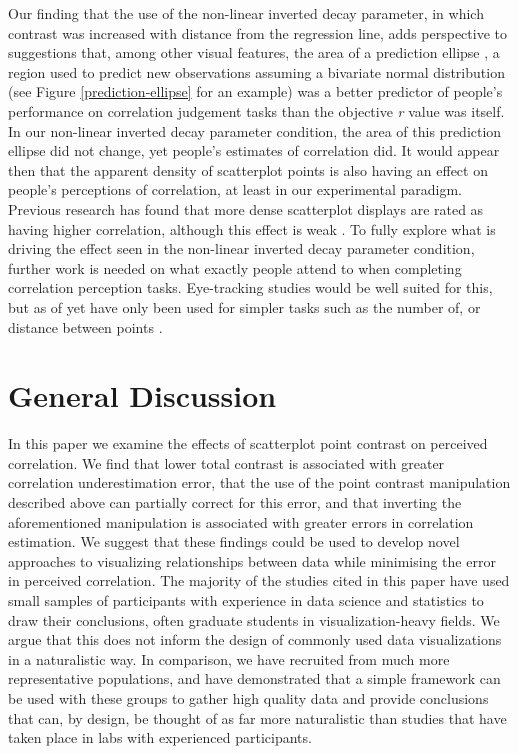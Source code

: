 \documentclass[preprint, 3p,
authoryear]{elsarticle} %
\begin{document}
Our finding that the use of the non-linear inverted decay parameter, in
which contrast was increased with distance from the regression line,
adds perspective to suggestions \citep{yang_2019} that, among other
visual features, the area of a prediction ellipse
\citep{yang_2019, cleveland_1982}, a region used to predict new
observations assuming a bivariate normal distribution (see Figure
\ref{prediction-ellipse} for an example) was a better predictor of
people's performance on correlation judgement tasks than the objective
\emph{r} value was itself. In our non-linear inverted decay parameter
condition, the area of this prediction ellipse did not change, yet
people's estimates of correlation did. It would appear then that the
apparent density of scatterplot points is also having an effect on
people's perceptions of correlation, at least in our experimental
paradigm. Previous research has found that more dense scatterplot
displays are rated as having higher correlation, although this effect is
weak \citep{lauer_1989, rensink_2014}. To fully explore what is driving
the effect seen in the non-linear inverted decay parameter condition,
further work is needed on what exactly people attend to when completing
correlation perception tasks. Eye-tracking studies would be well suited
for this, but as of yet have only been used for simpler tasks such as
the number of, or distance between points \citep{netzel_2017}.

\hypertarget{general-discussion}{%
\section{General Discussion}\label{general-discussion}}

In this paper we examine the effects of scatterplot point contrast on
perceived correlation. We find that lower total contrast is associated
with greater correlation underestimation error, that the use of the
point contrast manipulation described above can partially correct for
this error, and that inverting the aforementioned manipulation is
associated with greater errors in correlation estimation. We suggest
that these findings could be used to develop novel approaches to
visualizing relationships between data while minimising the error in
perceived correlation. The majority of the studies cited in this paper
have used small samples of participants with experience in data science
and statistics to draw their conclusions, often graduate students in
visualization-heavy fields. We argue that this does not inform the
design of commonly used data visualizations in a naturalistic way. In
comparison, we have recruited from much more representative populations,
and have demonstrated that a simple framework can be used with these
groups to gather high quality data and provide conclusions that can, by
design, be thought of as far more naturalistic than studies that have
taken place in labs with experienced participants.
\end{document}
